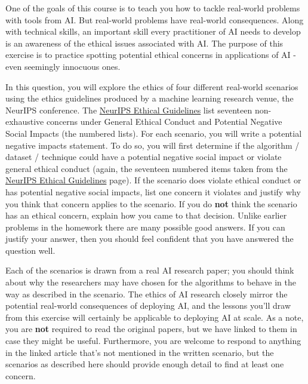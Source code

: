 \documentclass{article}
\theoremstyle{case}
\theoremstyle{definition}
\begin{document}
One of the goals of this course is to teach you how to tackle real-world problems with tools from AI. But real-world problems have real-world consequences. Along with technical skills, an important skill every practitioner of AI needs to develop is an awareness of the ethical issues associated with AI. The purpose of this exercise is to practice spotting potential ethical concerns in applications of AI - even seemingly innocuous ones.

In this question, you will explore the ethics of four different real-world scenarios using the ethics guidelines produced by a machine learning research venue, the NeurIPS conference. The \href{https://nips.cc/Conferences/2023/EthicsGuidelinesForReviewers}{NeurIPS Ethical Guidelines} list seventeen non-exhaustive concerns under General Ethical Conduct and Potential Negative Social Impacts (the numbered lists). For each scenario, you will write a potential negative impacts statement. To do so, you will first determine if the algorithm / dataset / technique could have a potential negative social impact or violate general ethical conduct (again, the seventeen numbered items taken from the \href{https://nips.cc/Conferences/2023/EthicsGuidelinesForReviewers}{NeurIPS Ethical Guidelines} page). If the scenario does violate ethical conduct or has potential negative social impacts, list one concern it violates and justify why you think that concern applies to the scenario. If you do \textbf{not} think the scenario has an ethical concern, explain how you came to that decision. Unlike earlier problems in the homework there are many possible good answers. If you can justify your answer, then you should feel confident that you have answered the question well.

Each of the scenarios is drawn from a real AI research paper; you should think about why the researchers may have chosen for the algorithms to behave in the way as described in the scenario. The ethics of AI research closely mirror the potential real-world consequences of deploying AI, and the lessons you'll draw from this exercise will certainly be applicable to deploying AI at scale. As a note, you are \textbf{not} required to read the original papers, but we have linked to them in case they might be useful. Furthermore, you are welcome to respond to anything in the linked article that's not mentioned in the written scenario, but the scenarios as described here should provide enough detail to find at least one concern.
\end{document}
